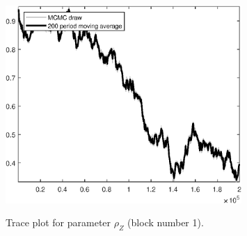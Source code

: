 \begin{figure}[H]
\centering
  \includegraphics[width=0.8\textwidth]{BRS_sectoral_rest/graphs/TracePlot_rho_Z_blck_1}\\
    \caption{Trace plot for parameter ${\rho_Z}$ (block number 1).}
\end{figure}
